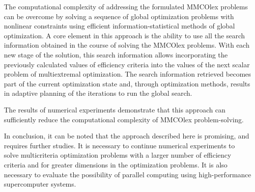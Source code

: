 \documentclass[smallextended]{svjour3}       %
\begin{document}
The computational complexity of addressing the formulated MMCOlex problems can be overcome by solving a sequence of global optimization problems with nonlinear constraints using efficient information-statistical methods of global optimization. A core element in this approach is the ability to use all the search information obtained in the course of solving the MMCOlex problems. With each new stage of the solution, this search information allows incorporating the previously calculated values of efficiency criteria into the values of the next scalar problem of multiextremal optimization. The search information retrieved becomes part of the current optimization state and, through optimization methods, results in adaptive planning of the iterations to run the global search. 

The results of numerical experiments demonstrate that this approach can sufficiently reduce the computational complexity of MMCOlex problem-solving.

In conclusion, it can be noted that the approach described here is promising, and requires further studies. It is necessary to continue numerical experiments to solve multicriteria optimization problems with a larger number of efficiency criteria and for greater dimensions in the optimization problems. It is also necessary to evaluate the possibility of parallel computing using high-performance supercomputer systems.
\end{document}
